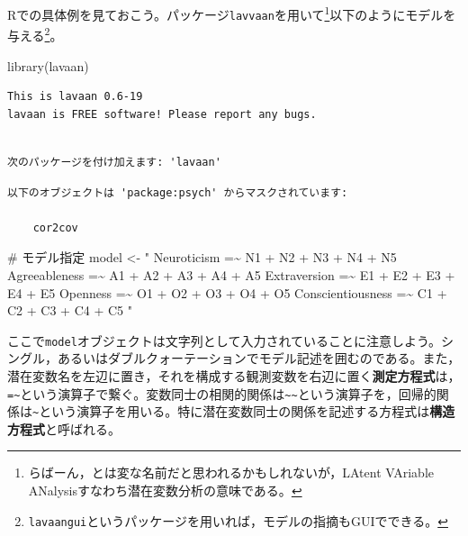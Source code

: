 \documentclass[
  a4paper,
]{ltjsbook}
\newenvironment{Shaded}{\begin{snugshade}}{\end{snugshade}}
\newcommand{\CommentTok}[1]{\textcolor[rgb]{0.37,0.37,0.37}{#1}}
\newcommand{\FunctionTok}[1]{\textcolor[rgb]{0.28,0.35,0.67}{#1}}
\newcommand{\NormalTok}[1]{\textcolor[rgb]{0.00,0.23,0.31}{#1}}
\newcommand{\OtherTok}[1]{\textcolor[rgb]{0.00,0.23,0.31}{#1}}
\newcommand{\StringTok}[1]{\textcolor[rgb]{0.13,0.47,0.30}{#1}}
\begin{document}
Rでの具体例を見ておこう。パッケージ\texttt{lavvaan}を用いて\footnote{らばーん，とは変な名前だと思われるかもしれないが，LAtent
  VAriable ANalysisすなわち潜在変数分析の意味である。}以下のようにモデルを与える\footnote{\texttt{lavaangui}というパッケージを用いれば，モデルの指摘もGUIでできる。}。

\begin{Shaded}
\begin{Highlighting}[]
\FunctionTok{library}\NormalTok{(lavaan)}
\end{Highlighting}
\end{Shaded}

\begin{verbatim}
This is lavaan 0.6-19
lavaan is FREE software! Please report any bugs.
\end{verbatim}

\begin{verbatim}

次のパッケージを付け加えます: 'lavaan'
\end{verbatim}

\begin{verbatim}
以下のオブジェクトは 'package:psych' からマスクされています:

    cor2cov
\end{verbatim}

\begin{Shaded}
\begin{Highlighting}[]
\CommentTok{\# モデル指定}
\NormalTok{model }\OtherTok{\textless{}{-}} \StringTok{"}
\StringTok{Neuroticism =\textasciitilde{} N1 + N2 + N3 + N4 + N5}
\StringTok{Agreeableness =\textasciitilde{} A1 + A2 + A3 + A4 + A5}
\StringTok{Extraversion =\textasciitilde{} E1 + E2 + E3 + E4 + E5}
\StringTok{Openness =\textasciitilde{} O1 + O2 + O3 + O4 + O5}
\StringTok{Conscientiousness =\textasciitilde{} C1 + C2 + C3 + C4 + C5}
\StringTok{"}
\end{Highlighting}
\end{Shaded}

ここで\texttt{model}オブジェクトは文字列として入力されていることに注意しよう。シングル，あるいはダブルクォーテーションでモデル記述を囲むのである。また，潜在変数名を左辺に置き，それを構成する観測変数を右辺に置く\textbf{測定方程式}は，\texttt{=\textasciitilde{}}という演算子で繋ぐ。変数同士の相関的関係は\texttt{\textasciitilde{}\textasciitilde{}}という演算子を，回帰的関係は\texttt{\textasciitilde{}}という演算子を用いる。特に潜在変数同士の関係を記述する方程式は\textbf{構造方程式}と呼ばれる。
\end{document}
